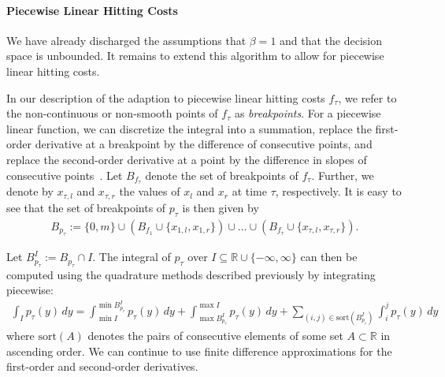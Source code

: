 \paragraph{Piecewise Linear Hitting Costs} We have already discharged the assumptions that $\beta = 1$ and that the decision space is unbounded. It remains to extend this algorithm to allow for piecewise linear hitting costs.

In our description of the adaption to piecewise linear hitting costs $f_{\tau}$, we refer to the non-continuous or non-smooth points of $f_{\tau}$ as \emph{breakpoints}. For a piecewise linear function, we can discretize the integral into a summation, replace the first-order derivative at a breakpoint by the difference of consecutive points, and replace the second-order derivative at a point by the difference in slopes of consecutive points~\cite{Bansal2015}. Let $B_{f_{\tau}}$ denote the set of breakpoints of $f_{\tau}$. Further, we denote by $x_{\tau,l}$ and $x_{\tau,r}$ the values of $x_l$ and $x_r$ at time $\tau$, respectively. It is easy to see that the set of breakpoints of $p_{\tau}$ is then given by \begin{align*}
    B_{p_{\tau}} := \{0, m\} \cup \left(B_{f_1} \cup \{x_{1,l}, x_{1,r}\}\right) \cup \dots \cup \left(B_{f_{\tau}} \cup \{x_{\tau,l}, x_{\tau,r}\}\right).
\end{align*}

Let $B_{p_{\tau}}^I := B_{p_{\tau}} \cap I$. The integral of $p_{\tau}$ over $I \subseteq \mathbb{R} \cup \{-\infty, \infty\}$ can then be computed using the quadrature methods described previously by integrating piecewise: \begin{align*}
    \int_I p_{\tau}(y) \,dy = \int_{\min I}^{\min B_{p_{\tau}}^I} p_{\tau}(y) \,dy + \int_{\max B_{p_{\tau}}^I}^{\max I} p_{\tau}(y) \,dy + \sum_{(i, j) \in \text{sort}(B_{p_{\tau}}^I)} \int_i^j p_{\tau}(y) \,dy
\end{align*} where $\text{sort}(A)$ denotes the pairs of consecutive elements of some set $A \subset \mathbb{R}$ in ascending order. We can continue to use finite difference approximations for the first-order and second-order derivatives.

